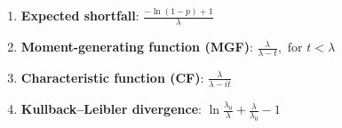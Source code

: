 \begin{enumerate}
    \item \textbf{Expected shortfall}:
    $
        {\displaystyle {\frac {-\ln(1-p)+1}{\lambda }}}
    $
    \hfill \cite{wiki/Exponential_distribution}

    \item \textbf{Moment-generating function (MGF)}: 
    $
        {\displaystyle {\frac {\lambda }{\lambda -t}},{\text{ for }}t<\lambda }
    $
    \hfill \cite{wiki/Exponential_distribution}

    \item \textbf{Characteristic function (CF)}:
    $
        {\displaystyle {\frac {\lambda }{\lambda -it}}}
    $
    \hfill \cite{wiki/Exponential_distribution}

    \item \textbf{Kullback–Leibler divergence}:
    $
        {\displaystyle \ln {\frac {\lambda _{0}}{\lambda }}+{\frac {\lambda }{\lambda _{0}}}-1}
    $
    \hfill \cite{wiki/Exponential_distribution}
\end{enumerate}







